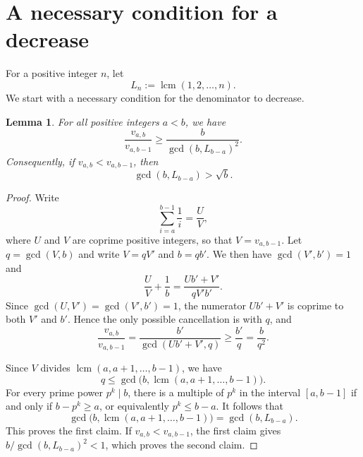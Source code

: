 \documentclass{amsart}
\newtheorem{lemma}[theorem]{Lemma}
\begin{document}
\section{A necessary condition for a decrease}
For a positive integer $n$, let
$$
L_n:=\operatorname{lcm}(1,2,\ldots,n).
$$
We start with a necessary condition for the denominator to decrease.

\begin{lemma}\label{local}
For all positive integers $a<b$, we have
$$
\frac{v_{a,b}}{v_{a,b-1}}\ge \frac{b}{\gcd(b,L_{b-a})^2}.
$$
Consequently, if $v_{a,b}<v_{a,b-1}$, then
$$
\gcd(b,L_{b-a})>\sqrt b.
$$
\end{lemma}

\begin{proof}
Write
$$
\sum_{i=a}^{b-1}\frac1i=\frac UV,
$$
where $U$ and $V$ are coprime positive integers, so that $V=v_{a,b-1}$. Let $q=\gcd(V,b)$ and write $V=qV'$ and $b=qb'$. We then have $\gcd(V',b')=1$ and
$$
\frac UV+\frac1b=\frac{Ub'+V'}{qV'b'}.
$$
Since $\gcd(U,V')=\gcd(V',b')=1$, the numerator $Ub'+V'$ is coprime to both $V'$ and $b'$. Hence the only possible cancellation is with $q$, and
$$
\frac{v_{a,b}}{v_{a,b-1}}
=\frac{b'}{\gcd(Ub'+V',q)}
\ge \frac{b'}q
=\frac{b}{q^2}.
$$

Since $V$ divides $\operatorname{lcm}(a,a+1,\ldots,b-1)$, we have
$$
q\le \gcd\big(b,\operatorname{lcm}(a,a+1,\ldots,b-1)\big).
$$
For every prime power $p^k\mid b$, there is a multiple of $p^k$ in the interval $[a,b-1]$ if and only if $b-p^k\ge a$, or equivalently $p^k\le b-a$. It follows that
$$
\gcd\big(b,\operatorname{lcm}(a,a+1,\ldots,b-1)\big)=\gcd(b,L_{b-a}).
$$
This proves the first claim. If $v_{a,b}<v_{a,b-1}$, the first claim gives $b/\gcd(b,L_{b-a})^2<1$, which proves the second claim.
\end{proof}
\end{document}
